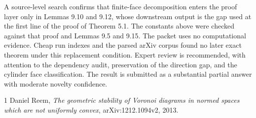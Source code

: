 \documentclass[11pt]{article}
\begin{document}
A source-level search confirms that finite-face decomposition enters the
proof layer only in Lemmas 9.10 and 9.12, whose downstream output is the gap
used at the first line of the proof of Theorem 5.1.  The constants above were
checked against that proof and Lemmas 9.5 and 9.15.  The packet uses no
computational evidence.  Cheap run indexes and the parsed arXiv corpus found
no later exact theorem under this replacement condition.  Expert review is
recommended, with attention to the dependency audit, preservation of the
direction gap, and the cylinder face classification.  The result is submitted
as a substantial partial answer with moderate novelty confidence.

\begin{thebibliography}{1}
Daniel Reem,
\newblock \emph{The geometric stability of Voronoi diagrams in normed spaces
which are not uniformly convex},
\newblock arXiv:1212.1094v2, 2013.
\end{thebibliography}
\end{document}
